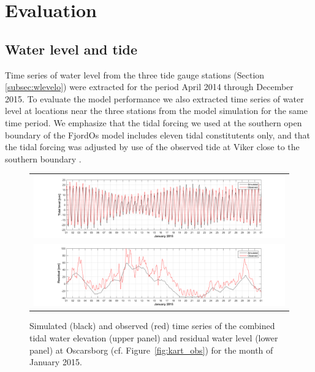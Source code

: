 \section{Evaluation}
\label{sec:evalu}
\subsection{Water level and tide}
\label{subsec:wlevele}
Time series of water level from the three tide gauge stations (Section \ref{subsec:wlevelo}) were extracted for the period April 2014 through December 2015. To evaluate the model performance we also extracted time series of water level at locations near the three stations from the model simulation for the same time period. We emphasize that the tidal forcing we used at the southern open boundary of the FjordOs model includes eleven tidal constitutents only, and that the tidal forcing was adjusted by use of the observed tide at Viker close to the southern boundary \citep{roed:etal:2016}. 

\begin{figure}[htb]
  \begin{center}
    \begin{tabular}{c}
      \includegraphics*[trim=3cm 0cm 2.5cm 0cm,clip=true,width=15cm]{Figurer/Oscarsborg_Tide_selected_jan15} \\ 
      \includegraphics*[trim=3cm 0cm 2.5cm 0cm,clip=true,width=15cm]{Figurer/Oscarsborg_WL_rest_jan15} \\ 
    \end{tabular}
    \caption{\small Simulated (black) and observed (red) time series of the combined tidal water elevation (upper panel) and residual water level (lower panel) at Oscarsborg (cf. Figure~\ref{fig:kart_obs}) for the month of January 2015.}
    \label{fig:Waterlevel_jan15}
  \end{center}
\end{figure}

